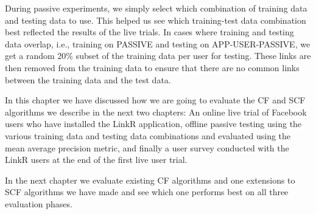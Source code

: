 During passive experiments, we simply select which combination of training data and testing data to use. This helped us see which training-test data combination best reflected the results of the live trials. %
In cases where training and testing data overlap, i.e., training on PASSIVE and testing on APP-USER-PASSIVE, we get a random 20\% subset of the training data per user for testing. These links are then removed from the training data to ensure that there are no common links between the training data and the test data.

In this chapter we have discussed how we are going to evaluate the CF and SCF algorithms we describe in the next two chapters: An online live trial of Facebook users who have installed the LinkR application, offline passive testing using the various training data and testing data combinations and evaluated using the mean average precision metric, and finally a user survey conducted with the LinkR users at the end of the first live user trial.

In the next chapter we evaluate existing CF algorithms and one extensions to SCF algorithms we have made and see which one performs best on all three evaluation phases.